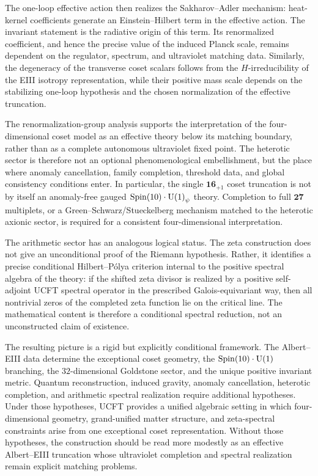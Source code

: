 \documentclass[pdflatex,sn-mathphys-num]{sn-jnl}
\theoremstyle{thmstyleone}
\theoremstyle{thmstylethree}%
\theoremstyle{thmstyletwo}%
\begin{document}
The one-loop effective action then realizes the Sakharov--Adler mechanism:
heat-kernel coefficients generate an Einstein--Hilbert term in the effective
action. The invariant statement is the radiative origin of this term. Its
renormalized coefficient, and hence the precise value of the induced Planck
scale, remains dependent on the regulator, spectrum, and ultraviolet matching
data. Similarly, the degeneracy of the transverse coset scalars follows from
the \(H\)-irreducibility of the EIII isotropy representation, while their
positive mass scale depends on the stabilizing one-loop hypothesis and the
chosen normalization of the effective truncation.

The renormalization-group analysis supports the interpretation of the
four-dimensional coset model as an effective theory below its matching
boundary, rather than as a complete autonomous ultraviolet fixed point. The
heterotic sector is therefore not an optional phenomenological embellishment,
but the place where anomaly cancellation, family completion, threshold data,
and global consistency conditions enter. In particular, the single
\(\mathbf{16}_{+1}\) coset truncation is not by itself an anomaly-free gauged
\(\operatorname{Spin}(10)\cdot\mathrm{U(1)}_\psi\) theory. Completion to full \(\mathbf{27}\)
multiplets, or a Green--Schwarz/Stueckelberg mechanism matched to the
heterotic axionic sector, is required for a consistent four-dimensional
interpretation.

The arithmetic sector has an analogous logical status. The zeta construction
does not give an unconditional proof of the Riemann hypothesis. Rather, it
identifies a precise conditional Hilbert--Pólya criterion internal to the
positive spectral algebra of the theory: if the shifted zeta divisor is
realized by a positive self-adjoint UCFT spectral operator in the prescribed
Galois-equivariant way, then all nontrivial zeros of the completed zeta
function lie on the critical line. The mathematical content is therefore a
conditional spectral reduction, not an unconstructed claim of existence.

The resulting picture is a rigid but explicitly conditional framework. The
Albert--EIII data determine the exceptional coset geometry, the
\(\operatorname{Spin}(10)\cdot\mathrm{U(1)}\) branching, the \(32\)-dimensional Goldstone sector,
and the unique positive invariant metric. Quantum reconstruction, induced
gravity, anomaly cancellation, heterotic completion, and arithmetic spectral
realization require additional hypotheses. Under those hypotheses, UCFT
provides a unified algebraic setting in which four-dimensional geometry,
grand-unified matter structure, and zeta-spectral constraints arise from one
exceptional coset representation. Without those hypotheses, the construction
should be read more modestly as an effective Albert--EIII truncation whose
ultraviolet completion and spectral realization remain explicit matching
problems.
\end{document}
